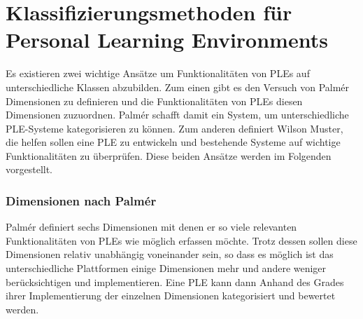 \section{Klassifizierungsmethoden für Personal Learning Environments}\label{section:klassifizierungsmethoden}
Es existieren zwei wichtige Ansätze um Funktionalitäten von PLEs auf unterschiedliche Klassen abzubilden. Zum einen gibt es den Versuch von Palmér Dimensionen zu definieren und die Funktionalitäten von PLEs diesen Dimensionen zuzuordnen. Palmér schafft damit ein System, um unterschiedliche PLE-Systeme kategorisieren zu können. Zum anderen definiert Wilson Muster, die helfen sollen eine PLE zu entwickeln und bestehende Systeme auf wichtige Funktionalitäten zu überprüfen. Diese beiden Ansätze werden im Folgenden vorgestellt.

\subsubsection{Dimensionen nach Palmér}\label{section:dimensions_palmer} 
Palmér definiert sechs Dimensionen mit denen er so viele relevanten Funktionalitäten von PLEs wie möglich erfassen möchte\cite{Palmer2009}. Trotz dessen sollen diese Dimensionen relativ unabhängig voneinander sein, so dass es möglich ist das unterschiedliche Plattformen einige Dimensionen mehr und andere weniger berücksichtigen und implementieren. Eine PLE kann dann Anhand des Grades ihrer Implementierung der einzelnen Dimensionen kategorisiert und bewertet werden.
